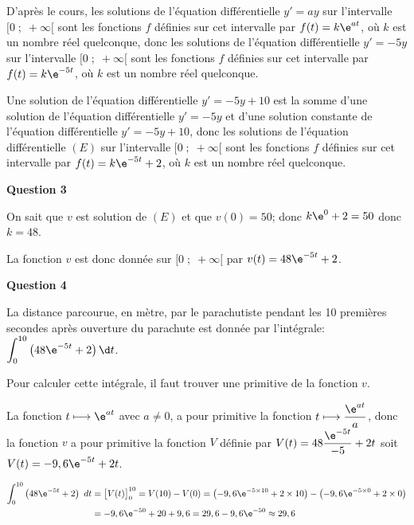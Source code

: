 \documentclass[a4paper,11pt,eval]{nsi}
\begin{document}
D'après le cours, les solutions de l'équation différentielle $y'=ay$ sur l'intervalle $[0\;;\;+\infty[$ sont les fonctions $f$ définies sur cet intervalle par $f(t)=k\e^{at}$,  où $k$ est un nombre réel quelconque, donc les solutions de l'équation différentielle $y'=-5y$ sur l'intervalle $[0\;;\;+\infty[$ sont les fonctions $f$ définies sur cet intervalle par $f(t)=k\e^{-5t}$,  où $k$ est un nombre réel quelconque.

Une solution de l'équation différentielle $y'=-5y+10$ est la somme d'une solution de l'équation différentielle $y'=-5y$ et d'une solution constante de l'équation différentielle $y'=-5y+10$, donc les solutions de l'équation différentielle $(E)$ sur l'intervalle $[0\;;\;+\infty[$ sont les fonctions $f$ définies sur cet intervalle par $f(t)=k\e^{-5t}+2$,  où $k$ est un nombre réel quelconque.

\begin{flushleft}
\textbf{Question 3}
\end{flushleft}

On sait que $v$ est solution de $(E)$ et que $v(0)=50$; donc $k\e^{0}+2 = 50$ donc $k=48$.

La fonction $v$ est donc donnée sur $[0\;;\;+\infty[$ par $v(t) = 48 \e^{-5t} + 2$.

\begin{flushleft}
\textbf{Question 4}
\end{flushleft}

La distance parcourue, en mètre, par le parachutiste pendant les 10 premières secondes après ouverture du parachute est donnée  par l'intégrale:
$\displaystyle\int_{0}^{10} \left ( 48 \e^{-5t} +2 \right ) \d t$.

Pour calculer cette intégrale, il faut trouver une primitive de la fonction $v$.

La fonction $t\longmapsto \e^{at}$ avec $a\neq 0$,  a pour primitive la fonction $t\longmapsto \dfrac{\e^{at}}{a}$, donc la fonction $v$ a pour primitive la fonction $V$ définie par $V(t) = 48 \dfrac{\e^{-5t}}{-5} + 2t$ soit $V(t) = - 9,6 \e^{-5t} +2t$.

$\begin{aligned}
\displaystyle\int_{0}^{10} \left ( 48 \e^{-5t} +2 \right ) \ dt&
= \left [ V(t) \strut\right ]_{0}^{10}
= V(10) - V(0)
= \left (-9,6 \e^{-5\times 10} + 2 \times 10 \right ) - \left ( -9,6 \e^{-5\times 0} + 2 \times 0 \right )\\
&
= -9,6 \e^{-50} + 20+9,6  = 29,6 -9,6 \e^{-50} \approx 29,6
\end{aligned}$
\end{document}
